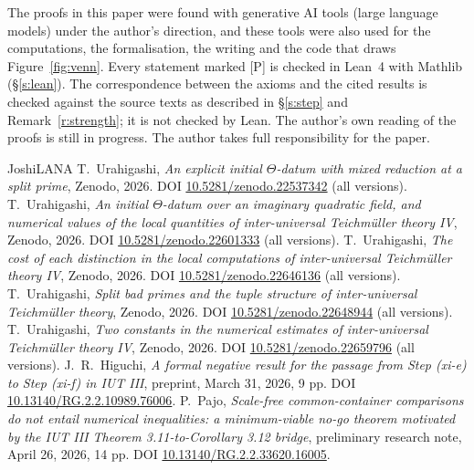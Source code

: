 \documentclass[11pt]{article}
\theoremstyle{plain}
\theoremstyle{definition}
\theoremstyle{remark}
\newcommand{\Pmark}{\textup{[P]}}
\begin{document}
The proofs in this paper were found with generative AI tools (large language models)
under the author's direction, and these tools were also used for the computations, the
formalisation, the writing and the code that draws Figure~\ref{fig:venn}. Every statement
marked \Pmark{} is checked in Lean~4 with Mathlib (\S\ref{s:lean}). The correspondence
between the axioms and the cited results is checked against the source texts as described
in \S\ref{s:step} and Remark~\ref{r:strength}; it is not checked by Lean. The author's own
reading of the proofs is still in progress. The author takes full responsibility for the
paper.

\begin{thebibliography}{JoshiLANA}
 T.~Urahigashi, \emph{An explicit initial $\Theta$-datum with
 mixed reduction at a split prime}, Zenodo, 2026.
 DOI \href{https://doi.org/10.5281/zenodo.22537342}{10.5281/zenodo.22537342}
 (all versions).
 T.~Urahigashi, \emph{An initial $\Theta$-datum over an
 imaginary quadratic field, and numerical values of the local quantities of
 inter-universal Teichm\"uller theory IV}, Zenodo, 2026.
 DOI \href{https://doi.org/10.5281/zenodo.22601333}{10.5281/zenodo.22601333}
 (all versions).
 T.~Urahigashi, \emph{The cost of each distinction in the local
 computations of inter-universal Teichm\"uller theory IV}, Zenodo, 2026.
 DOI \href{https://doi.org/10.5281/zenodo.22646136}{10.5281/zenodo.22646136}
 (all versions).
 T.~Urahigashi, \emph{Split bad primes and the tuple structure of
 inter-universal Teichm\"uller theory}, Zenodo, 2026.
 DOI \href{https://doi.org/10.5281/zenodo.22648944}{10.5281/zenodo.22648944}
 (all versions).
 T.~Urahigashi, \emph{Two constants in the numerical estimates of
 inter-universal Teichm\"uller theory IV}, Zenodo, 2026.
 DOI \href{https://doi.org/10.5281/zenodo.22659796}{10.5281/zenodo.22659796}
 (all versions).
 J.~R.~Higuchi, \emph{A formal negative result for the passage
 from Step (xi-e) to Step (xi-f) in IUT III}, preprint, March 31, 2026, 9 pp.
 DOI \href{https://doi.org/10.13140/RG.2.2.10989.76006}{10.13140/RG.2.2.10989.76006}.
 P.~Pajo, \emph{Scale-free common-container comparisons do not entail
 numerical inequalities: a minimum-viable no-go theorem motivated by the IUT III
 Theorem 3.11-to-Corollary 3.12 bridge}, preliminary research note, April 26, 2026, 14 pp.
 DOI \href{https://doi.org/10.13140/RG.2.2.33620.16005}{10.13140/RG.2.2.33620.16005}.

\end{thebibliography}
\end{document}
